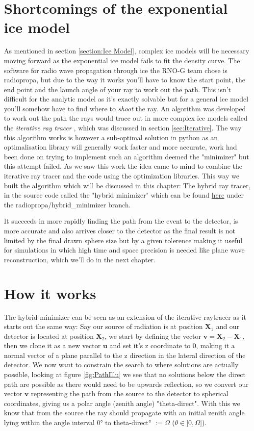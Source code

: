 \documentclass[11pt,a4paper,faculty=we,language=en,doctype=report]{cls/ugent-doc}
\begin{document}
\section{Shortcomings of the exponential ice model}
As mentioned in section \ref{section:Ice Model}, complex ice models will be
necessary moving forward as the exponential ice model fails to fit the density
curve.  The software for radio wave propagation through ice the RNO-G team
chose is radiopropa\cite{Winchen_2019}, but due to the way it works you'll have
to know the start point, the end point and the launch angle of your ray to work
out the path. This isn't difficult for the analytic model as it's exactly
solvable but for a general ice model you'll somehow have to find where to
\textit{shoot} the ray. An algorithm was developed to work out the path the
rays would trace out in more complex ice models called the \textit{iterative
ray tracer} \cite{2022icrc.confE1027O}, which was discussed in section
\ref{sec:Iterative}. The way this algorithm works is however a sub-optimal
solution in python as an optimalisation library will generally work faster and
more accurate, work had been done on trying to implement such an algorithm
deemed the "minimizer" but this attempt failed.  As we saw this work the idea
came to mind to combine the iterative ray tracer and the code using the
optimization libraries. This way we built the algorithm which will be discussed in
this chapter: The hybrid ray tracer, in the source code called the "hybrid
minimizer" which can be found
\href{https://github.com/arthuradriaens-code/NuRadioMC.git}{here} under the
radiopropa/hybrid\_minimizer branch.

It succeeds in more rapidly finding the path from the event to the detector, is
more accurate and also arrives closer to the detector as the final result is
not limited by the final drawn sphere size but by a given tolerence making it
useful for simulations in which high time and space precision is needed like
plane wave reconstruction, which we'll do in the next chapter.

\section{How it works}
The hybrid minimizer can be seen as an extension of the iterative raytracer as
it starts out the same way: Say our source of radiation is at position
$\mathbf{X}_1$ and our detector is located at position $\mathbf{X}_2$, we start
by defining the vector $\mathbf{v} = \mathbf{X}_2 - \mathbf{X}_1$, then we
clone it as a new vector $\mathbf{u}$ and set it's z coordinate to 0, making it a normal
vector of a plane parallel to the z direction in the lateral direction of the detector. 
We now want to constrain the search to where solutions are actually possible, 
looking at figure \ref{fig:PathIllu}
we see that no solutions below the direct path are possible as there would need
to be upwards reflection, so we convert our vector $\mathbf{v}$ representing
the path from the source to the detector to spherical coordinates, giving us a
polar angle (zenith angle) "theta-direct". With this we know that from the source
the ray should propagate with an initial zenith angle lying within the angle interval
0° to theta-direct° $:= \Omega$ ($\theta \in ]0,\Omega]$).
\end{document}
